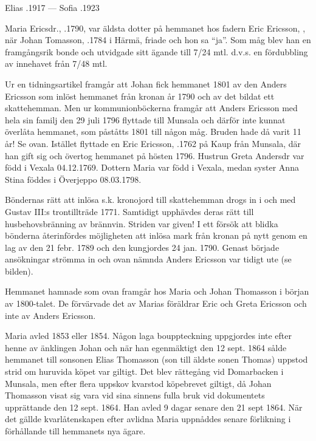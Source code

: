 Elias .1917 --- Sofia .1923


%
Maria Ericsdr., .1790, var äldsta dotter på hemmanet hos fadern Eric Ericsson, , när Johan Tomasson, .1784 i Härmä, friade och hon sa ``ja''. Som måg blev han en framgångsrik bonde och utvidgade sitt ägande till 7/24 mtl. d.v.s. en fördubbling av innehavet från 7/48 mtl.

Ur en tidningsartikel framgår att Johan fick hemmanet 1801 av den Anders Ericsson som inlöst hemmanet från kronan år 1790 och av det bildat ett skattehemman. Men ur kommunionböckerna framgår att Anders Ericsson med hela sin familj den 29 juli 1796 flyttade till Munsala och därför inte kunnat överlåta hemmanet, som påståtts
1801 till någon måg. Bruden hade då varit 11 år! Se ovan. Istället flyttade en Eric Ericsson, .1762 på Kaup från Munsala, där han gift sig och övertog hemmanet på hösten 1796. Hustrun Greta Andersdr var född i Vexala 04.12.1769. Dottern Maria var född i Vexala, medan syster Anna Stina föddes i Överjeppo 08.03.1798.

Böndernas rätt att inlösa s.k. kronojord till skattehemman drogs in i och med Gustav III:s trontillträde 1771. Samtidigt upphävdes deras rätt till husbehovsbränning av brännvin. Striden var given! I ett försök att blidka bönderna återinfördes möjligheten att inlösa mark från kronan på nytt genom en lag av den 21 febr. 1789 och den
kungjordes 24 jan. 1790. Genast började ansökningar strömma in och ovan nämnda Anders Ericsson var tidigt ute (se bilden).



Hemmanet hamnade som ovan framgår hos Maria och Johan Thomasson i början av 1800-talet. De förvärvade det av Marias föräldrar Eric och Greta Ericsson och inte av Anders Ericsson.
\begin{jhchildren}
  \item {}
  \item {}
  \item {}
  \item {}
\end{jhchildren}
Maria avled 1853 eller 1854. Någon laga bouppteckning uppgjordes inte efter henne av änklingen Johan och när han egenmäktigt den 12 sept. 1864 sålde hemmanet till sonsonen Elias Thomasson (son till äldste sonen Thomas) uppstod strid om huruvida köpet var giltigt. Det blev rättegång vid Domarbacken i Munsala, men efter flera uppskov kvarstod köpebrevet giltigt, då Johan Thomasson visat sig vara vid sina sinnens fulla bruk vid dokumentets upprättande den 12 sept. 1864. Han avled 9 dagar senare den 21 sept 1864. När det gällde kvarlåtenskapen efter avlidna Maria uppnåddes senare förlikning i förhållande till hemmanets nya ägare.

